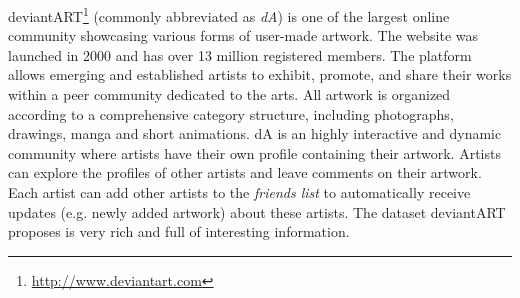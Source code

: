 deviantART\footnote{\url{http://www.deviantart.com}} (commonly abbreviated as \textit{dA}) is one of the largest online community showcasing various forms of user-made artwork.
The website was launched in 2000 and has over 13 million registered members.
The platform allows emerging and established artists to exhibit, promote, and share their works within a peer community dedicated to the arts. 
All artwork is organized according to a comprehensive category structure, including photographs, drawings, manga and short animations.
dA is an highly interactive and dynamic community where artists have their own profile containing their artwork.
Artists can explore the profiles of other artists and leave comments on their artwork.
Each artist can add other artists to the \textit{friends list} to automatically receive updates (e.g. newly added artwork) about these artists.
The dataset deviantART proposes is very rich and full of interesting information.




